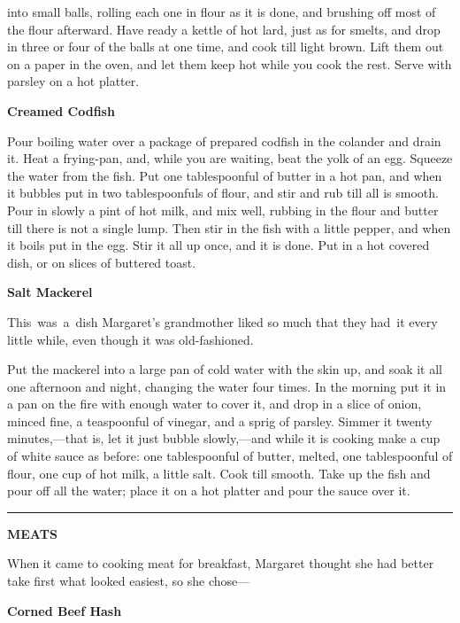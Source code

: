 \documentclass[11pt]{book}
\newcommand{\hstroke}{\rule[0.5ex]{5.0em}{0.2ex}}
\newcommand{\indpar}{\par\noindent\hspace*{\parindent}}
\newcommand{\instruction}{\indpar}
\newenvironment{RecipeTitle}{\medskip\begin{center}\large\bf }{\end{center}\smallskip}
\newenvironment{FoodTypeTitle}{\begin{center}\large\bf }{\end{center}}
\begin{document}
into small balls, rolling each one in flour as it is done, and
brushing off most of the flour afterward.  Have ready a kettle of
hot lard, just as for smelts, and drop in three or four of the
balls at one time, and cook till light brown.  Lift them out on
a paper in the oven, and let them keep hot while you cook the
rest.  Serve with parsley on a hot platter.
\begin{RecipeTitle}
Creamed Codfish\label{creamed_codfish}
\end{RecipeTitle}
\instruction
  Pour boiling water over a package of prepared codfish in the
colander and drain it.  Heat a frying-pan, and, while you are
waiting, beat the yolk of an egg.  Squeeze the water from the
fish.  Put one tablespoonful of butter in a hot pan, and when it
bubbles put in two tablespoonfuls of flour, and stir and rub till
all is smooth.  Pour in slowly a pint of hot milk, and mix well,
rubbing in the flour and butter till there is not a single lump.
Then stir in the fish with a little pepper, and when it boils
put in the egg.  Stir it all up once, and it is done.  Put in a
hot covered dish, or on slices of buttered toast.
\begin{RecipeTitle}
Salt Mackerel\label{salt_mackerel}
\end{RecipeTitle}
\instruction
  This\, was\, a\, dish Margaret's grandmother liked so much that they
had\, it every little while, even though it was old-fashioned.
\instruction
  Put the mackerel into a large pan of cold water with the skin
up, and soak it all one afternoon and night, changing the water
four times.  In the morning put it in a pan on the fire with enough
water to cover it, and drop in a slice of onion, minced fine, a
teaspoonful of vinegar, and a sprig of parsley.  Simmer it twenty
minutes,---that is, let it just bubble slowly,---and while it
is cooking make a cup of white sauce as before: one tablespoonful
of butter, melted, one tablespoonful of flour, one cup of hot milk,
a little salt.  Cook till smooth.  Take up the fish and pour off
all the water; place it on a hot platter and pour the sauce over it.
\bigskip
\begin{center}
\hstroke
\end{center}
\begin{FoodTypeTitle}
MEATS\label{MEATS}
\end{FoodTypeTitle}
\indpar
  When it came to cooking meat for breakfast, Margaret thought she
had better take first what looked easiest, so she chose---
\begin{RecipeTitle}
Corned Beef Hash\label{corned_beef_hash}
\end{RecipeTitle}
\end{document}
